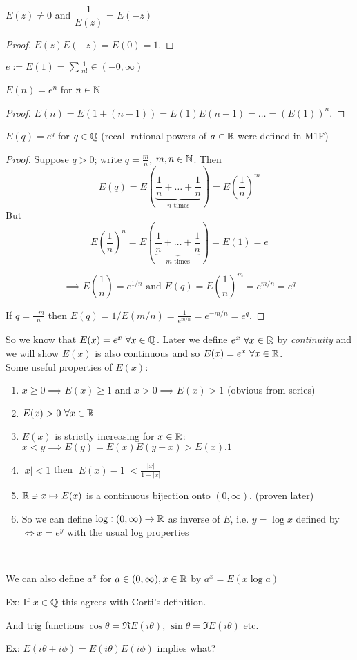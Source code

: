 \begin{corollary}
$E(z) \neq 0$ and $\dfrac{1}{E(z)} = E(-z)$
\end{corollary}
\begin{proof}
$E(z)E(-z) = E(0) = 1$.	
\end{proof}\vspace*{5pt}

\begin{definition}
$e:= E(1) = \sum \frac{1}{n!} \in (-0,\infty)$	
\end{definition}\vspace*{5pt}

\begin{corollary}
$E(n) = e^n$ for $n \in\mathbb{N}$	
\end{corollary}
\begin{proof}
	$E(n) = E(1 + (n-1)) = E(1)E(n-1) = \dots = (E(1))^n$.
\end{proof}

\begin{proposition}
$E(q) = e^q$ for $q \in\mathbb{Q}$ (recall rational powers of $a \in\mathbb{R}$ were defined in M1F)	
\end{proposition}
\begin{proof}
	Suppose $q > 0$; write $q = \frac{m}{n}$, $m,n \in\mathbb{N}$. Then 
	\[\textstyle{E(q) = E(\underbrace{\frac{1}{n} + \dots + \frac{1}{n}}_{n \text{ times}}) = E(\frac{1}{n})^m}\]
	But \[E(\frac{1}{n})^n = E(\underbrace{\frac{1}{n} + \dots + \frac{1}{n}}_{m \text{ times}}) = E(1) = e\]
	
	\[ \implies E(\frac{1}{n}) = e^{1/n}\text{ and }E(q) = E(\frac{1}{n})^m = e^{m/n} = e^q\]
	
	If $q = \frac{-m}{n}$ then $E(q) = 1/E(m/n) = \frac{1}{e^{m/n}} = e^{-m/n} = e^q$.
\end{proof}

So we know that $E(x) = e^x ~\forall x \in\mathbb{Q}$. Later we define $e^x~\forall x\in\mathbb{R}$ by \emph{continuity} and we will show $E(x)$ is also continuous and so $E(x) = e^x~\forall x\in\mathbb{R}$. \\
 
 
Some  useful properties of $E(x)$:
\begin{enumerate}
\item $x \geq 0 \implies E(x) \geq 1$ and $x > 0 \implies E(x) > 1$ (obvious from series)
\item $E(x) > 0~\forall x \in\mathbb{R}$
\item $E(x)$ is strictly increasing for $x\in\mathbb{R}$: $x < y \implies E(y) = E(x)E(y-x) > E(x).1$
\item $|x| < 1$ then $|E(x) - 1| < \frac{|x|}{1-|x|}$
\item $\mathbb{R} \ni x \mapsto E(x)$ is a continuous bijection onto $(0,\infty)$. (proven later)
\item So we can define $\log: (0,\infty) \to \mathbb{R}$ as inverse of $E$, i.e. $y = \log x$ defined by $\iff x = e^y$ with the usual log properties
\end{enumerate}~

We can also define $a^x$ for $a \in(0,\infty),x\in \mathbb{R}$ by $a^x = E(x\log a)$

Ex: If $x \in\mathbb{Q}$ this agrees with Corti's definition. 

And trig functions $\cos \theta = \Re E(i\theta)$, $\sin \theta = \Im E(i\theta)$ etc. 

Ex: $E(i\theta + i\phi) = E(i\theta)E(i\phi)$ implies what?
	


\pagebreak